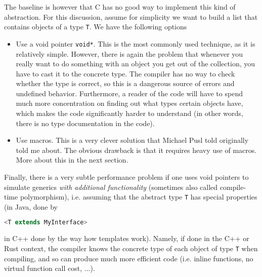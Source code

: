 \documentclass{scrartcl}
\begin{document}
The baseline is however that C has no good way to implement this kind of abstraction. For this discussion, assume for simplicity we want to build a list that contains objects of a type \lstinline{T}.
We have the following options
\begin{itemize}
    \item Use a void pointer \lstinline{void*}. 
    This is the most commonly used technique, as it is relatively simple.
    However, there is again the problem that whenever you really want to do something with an object you get out of the collection, you have to cast it to the concrete type.
    The compiler has no way to check whether the type is correct, so this is a dangerous source of errors and undefined behavior.
    Furthermore, a reader of the code will have to spend much more concentration on finding out what types certain objects have, which makes the code significantly harder to understand (in other words, there is no type documentation in the code).
    \item Use macros. This is a very clever solution that Michael Pusl told originally told me about.
    The obvious drawback is that it requires heavy use of macros.
    More about this in the next section.
\end{itemize}
Finally, there is a very subtle performance problem if one uses void pointers to simulate generics \textit{with additional functionality} (sometimes also called compile-time polymorphism), i.e. assuming that the abstract type \lstinline{T} has special properties (in Java, done by 
\begin{lstlisting}[language = java]
    <T extends MyInterface>
\end{lstlisting}
in C++ done by the way how templates work).
Namely, if done in the C++ or Rust context, the compiler knows the concrete type of each object of type \lstinline{T} when compiling, and so can produce much more efficient code (i.e. inline functions, no virtual function call cost, ...).
\end{document}
